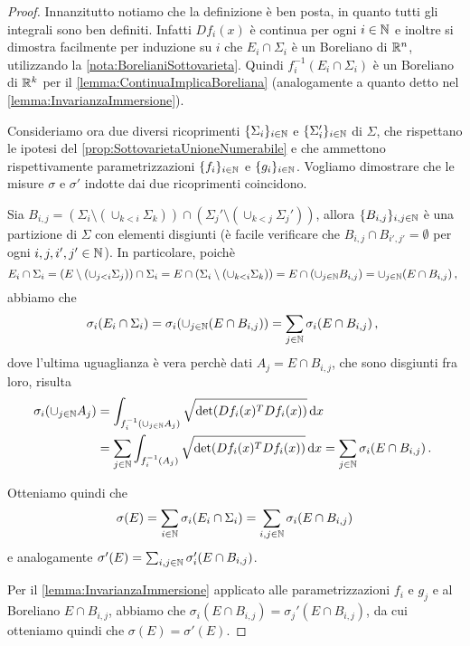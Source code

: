 \begin{proof}
	Innanzitutto notiamo che la definizione è ben posta, in quanto tutti gli integrali sono ben definiti. Infatti $Df_i(x)$ è continua per ogni $i\in\mathbb N$ e inoltre si dimostra facilmente per induzione su $i$ che $E_i\cap\Sigma_i$ è un Boreliano di $\mathbb R^n$, utilizzando la \cref{nota:BorelianiSottovarieta}. Quindi $f_i^{-1}(E_i\cap\Sigma_i)$ è un Boreliano di $\mathbb R^k$ per il \cref{lemma:ContinuaImplicaBoreliana} (analogamente a quanto detto nel \cref{lemma:InvarianzaImmersione}).

	Consideriamo ora due diversi ricoprimenti $\{\Sigma_i\}_{i\in\mathbb N}$ e $\{\Sigma_i'\}_{i\in\mathbb N}$ di $\Sigma$, che rispettano le ipotesi del \cref{prop:SottovarietaUnioneNumerabile} e che ammettono rispettivamente parametrizzazioni $\{f_i\}_{i\in\mathbb N}$ e $\{g_i\}_{i\in\mathbb N}$. Vogliamo dimostrare che le misure $\sigma$ e $\sigma'$ indotte dai due ricoprimenti coincidono.
	
	Sia $B_{i,j}=(\Sigma_i\setminus (\cup_{k<i}\Sigma_k))\cap (\Sigma_j'\setminus (\cup_{k<j}\Sigma_j'))$, allora $\{B_{i,j}\}_{i,j\in\mathbb N}$ è una partizione di $\Sigma$ con elementi disgiunti (è facile verificare che $B_{i,j}\cap B_{i',j'}=\emptyset$ per ogni $i,j,i',j'\in\mathbb N$). In particolare, poichè
	\begin{equation*}
		E_i\cap\Sigma_i=(E\setminus (\cup_{j<i}\Sigma_j))\cap \Sigma_i=E\cap (\Sigma_i\setminus (\cup_{k<i}\Sigma_k))=E\cap (\cup_{j\in\mathbb N}B_{i,j})=\cup_{j\in\mathbb N}(E\cap B_{i,j})\, \text{, }
	\end{equation*}
	abbiamo che
	\begin{equation*}
		\sigma_i(E_i\cap \Sigma_i)=\sigma_i(\cup_{j\in\mathbb N}(E\cap B_{i,j}))=\sum_{j\in\mathbb N}\sigma_i(E\cap B_{i,j})\, \text{, }
	\end{equation*}
	dove l'ultima uguaglianza è vera perchè dati $A_j=E\cap B_{i,j}$, che sono disgiunti fra loro, risulta
	\begin{align*}
		\sigma_i(\cup_{j\in\mathbb N}A_j)& =\int_{f_i^{-1}(\cup_{j\in\mathbb N}A_j)}\sqrt{\det(Df_i(x)^TDf_i(x))} \,\mathrm d x\\
		&=\sum_{j\in\mathbb N}\int_{f_i^{-1}(A_j)}\sqrt{\det(Df_i(x)^TDf_i(x))} \,\mathrm d x=\sum_{j\in\mathbb N}\sigma_i(E\cap B_{i,j})\, \text{. }
	\end{align*}
	
	Otteniamo quindi che
	\begin{equation*}
		\sigma(E)=\sum_{i\in\mathbb N}\sigma_i(E_i\cap \Sigma_i)=\sum_{i,j\in\mathbb N} \sigma_i(E\cap B_{i,j})
	\end{equation*}
	e analogamente $\sigma'(E)=\sum_{i,j\in\mathbb N} \sigma_i'(E\cap B_{i,j})$.

	Per il \cref{lemma:InvarianzaImmersione} applicato alle parametrizzazioni $f_i$ e $g_j$ e al Boreliano $E\cap B_{i,j}$, abbiamo che $\sigma_i(E\cap B_{i,j})=\sigma_j'(E\cap B_{i,j})$, da cui otteniamo quindi che $\sigma(E)=\sigma'(E)$.
\end{proof}

